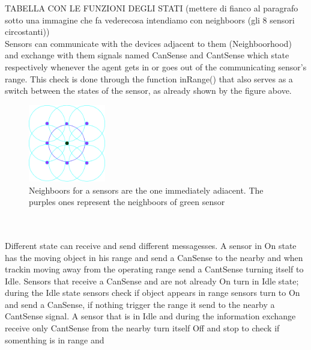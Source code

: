 \documentclass[twocolumn]{article}
\begin{document}
    TABELLA CON LE FUNZIONI DEGLI STATI (mettere di fianco al paragrafo sotto una immagine che fa  vederecosa intendiamo con neighboors (gli 8 
    sensori circostanti))
    \\
    Sensors can communicate with the devices adjacent to them (Neighboorhood) and exchange with them signals named CanSense and CantSense
    which state respectively whenever the agent gets in or goes out of the communicating sensor's range. This check is done through the 
    function inRange() that also serves as a switch between the states of the sensor, as already shown by the figure above.
    \begin{figure}[h!]
        \centering
        \includegraphics[width=0.3\textwidth]{Immagini/Neighboors.png}
        \caption{Neighboors for a sensors are the one immediately adiacent. The purples ones represent the neighboors of green sensor}
        \label{fig:galaxy}
    \end{figure}
    \\
    \\
    Different state can receive and send different messagesses. A sensor in On state has the moving
    object in his range and send a CanSense to the nearby and when trackin moving away from the operating range send a CantSense turning itself to Idle.
    Sensors that receive a CanSense and are not already On turn in Idle state; during the Idle state sensors check
    if object appears in range sensors turn to On and send a CanSense, if nothing trigger the range it send to the nearby a CantSense signal.
    A sensor that is in Idle and during the information exchange receive only CantSense from the nearby turn itself Off and stop to check if somenthing is in range and
\end{document}
